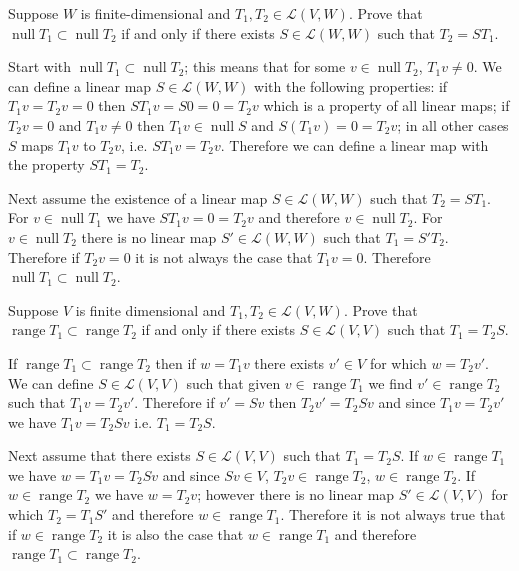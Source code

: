 \documentclass[11pt,a4paper]{scrartcl}
\DeclareMathOperator{\range}{range}
\DeclareMathOperator{\nspace}{null}
\newcommand{\lmap}[2]{\mathcal{L}(#1,#2)}
\newcounter{problem}
\begin{document}
\newpage

\begin{problem}[3.B.24]
    {
            Suppose $W$ is finite-dimensional and $T_1,T_2 \in \lmap{V}{W}$. Prove that $\nspace T_1 \subset \nspace T_2$ if and only if there exists $S \in \lmap{W}{W}$ such that $T_2=ST_1$.
    }
    {
        Start with $\nspace T_1 \subset \nspace T_2$; this means that for some $v \in \nspace T_2$, $T_1v \neq 0$. We can define a linear map $S\in \lmap{W}{W}$  with the following properties: if $T_1v=T_2v=0$ then $ST_1v=S0=0=T_2v$ which is a property of all linear maps; if $T_2v=0$ and $T_1v\neq 0$ then $T_1v \in \nspace S$ and
        $S(T_1v)=0=T_2v$; in all other cases $S$ maps $T_1v$ to $T_2v$, i.e. $ST_1v=T_2v$. Therefore we can define a linear map with the property $ST_1=T_2$.
        
        Next assume the existence of a linear map
        $S \in \lmap{W}{W}$ such that $T_2=ST_1$. For 
        $v \in \nspace T_1$ we have $ST_1v=0=T_2v$ and therefore
        $v \in \nspace T_2$. For $v \in \nspace T_2$ there is no linear map $S' \in \lmap{W}{W}$ such that $T_1=S'T_2$.
        Therefore if $T_2v=0$ it is not always the case that
        $T_1v=0$. Therefore $\nspace T_1 \subset \nspace T_2$.
    }
\end{problem}
    
\begin{problem}[3.B.25]
{    
    Suppose $V$ is finite dimensional and $T_1,T_2 \in \lmap{V}{W}$. Prove that $\range T_1 \subset \range T_2$ if and only if there exists $S \in \lmap{V}{V}$ such that $T_1=T_2 S$.
}
{
If $\range T_1 \subset \range T_2$ then if $w=T_1v$
there exists $v'\in V$ for which $w=T_2 v'$. We can define
$S\in \lmap{V}{V}$ such that given $v \in \range T_1$
we find $v' \in \range T_2$ such that $T_1v=T_2v'$. Therefore if $v'=Sv$ then $T_2v'=T_2Sv$ and since $T_1v=T_2v'$ we have $T_1v=T_2Sv$ i.e. $T_1=T_2S$.

Next assume that there exists $S \in \lmap{V}{V}$ such that $T_1=T_2 S$. If $w \in \range T_1$ we have
$w=T_1v=T_2Sv$ and since $Sv \in V$, $T_2v \in \range T_2$,
$w \in \range T_2$. If $w \in \range T_2$ we have $w=T_2v$;
however there is no linear map $S'\in \lmap{V}{V}$ for which $T_2=T_1S'$ and therefore $w \in \range T_1$. Therefore it is not always true that if $w \in \range T_2$ it is also the case that $w \in \range T_1$ and therefore $\range T_1 \subset \range T_2$.
}
\end{problem}
\end{document}
